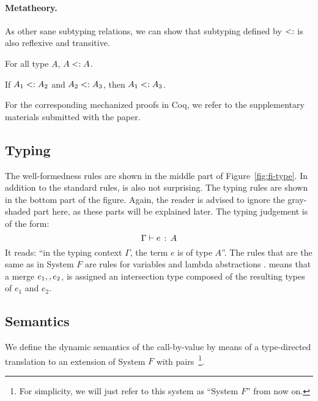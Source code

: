 \paragraph{Metatheory.} As other sane subtyping relations, we can show that
subtyping defined by $<:$ is also reflexive and transitive.

\begin{lemma} \label{lemma:sub-refl}
  For all type $ A $, $ A <: A $.
\end{lemma}

\begin{lemma} \label{lemma:sub-trans}
  If $ A_1 <: A_2 $ and $ A_2 <: A_3 $,
  then $ A_1 <: A_3 $.
\end{lemma}

For the corresponding mechanized proofs in Coq, we refer to the supplementary
materials submitted with the paper.

\subsection{Typing}

The well-formedness rules are shown in the middle part of
Figure~\ref{fig:fi-type}. In addition to the standard rules,
 is also not surprising. The typing rules are shown in
the bottom part of the figure. Again, the reader is advised to ignore the
gray-shaded part here, as these parts will be explained later. The typing judgement is
of the form: \[ \Gamma \vdash e \ \!:\! \ A \] It reads: ``in the typing context $\Gamma$,
the term $e$ is of type $A$''. The rules that are the same as in System $F$ are
rules for variables  and lambda abstractions
.
 means that a merge $e_1 ,, e_2$,
is assigned an intersection type composed of the resulting types of
$e_1$ and $e_2$.

\subsection{Semantics}

We define the dynamic semantics of the call-by-value \name by means of
a type-directed translation to an extension of System $F$ with pairs~\footnote{
  For simplicity, we will just refer to this system as ``System $F$''
  from now on.}.


